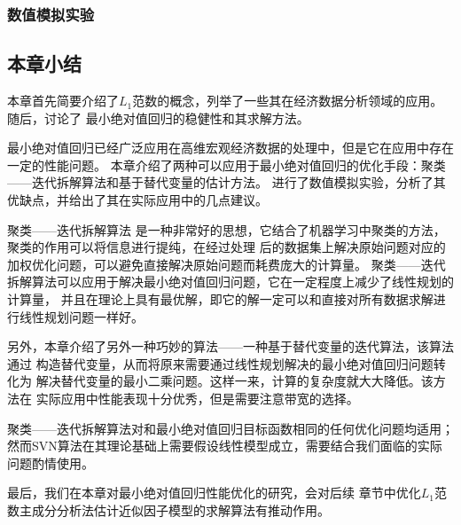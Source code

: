 \subsubsection{数值模拟实验}

\subsection{本章小结}

本章首先简要介绍了$L_1$范数的概念，列举了一些其在经济数据分析领域的应用。随后，讨论了
最小绝对值回归的稳健性和其求解方法。

最小绝对值回归已经广泛应用在高维宏观经济数据的处理中，但是它在应用中存在一定的性能问题。
本章介绍了两种可以应用于最小绝对值回归的优化手段：聚类——迭代拆解算法和基于替代变量的估计方法。
进行了数值模拟实验，分析了其优缺点，并给出了其在实际应用中的几点建议。

聚类——迭代拆解算法
是一种非常好的思想，它结合了机器学习中聚类的方法，聚类的作用可以将信息进行提纯，在经过处理
后的数据集上解决原始问题对应的加权优化问题，可以避免直接解决原始问题而耗费庞大的计算量。
聚类——迭代拆解算法可以应用于解决最小绝对值回归问题，它在一定程度上减少了线性规划的计算量，
并且在理论上具有最优解，即它的解一定可以和直接对所有数据求解进行线性规划问题一样好。

另外，本章介绍了另外一种巧妙的算法——一种基于替代变量的迭代算法，该算法通过
构造替代变量，从而将原来需要通过线性规划解决的最小绝对值回归问题转化为
解决替代变量的最小二乘问题。这样一来，计算的复杂度就大大降低。该方法在
实际应用中性能表现十分优秀，但是需要注意带宽的选择。

聚类——迭代拆解算法对和最小绝对值回归目标函数相同的任何优化问题均适用；
然而SVN算法在其理论基础上需要假设线性模型成立，需要结合我们面临的实际问题酌情使用。

最后，我们在本章对最小绝对值回归性能优化的研究，会对后续
章节中优化$L_1$范数主成分分析法估计近似因子模型的求解算法有推动作用。
